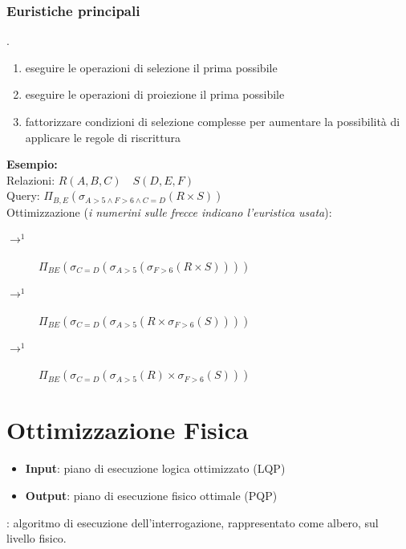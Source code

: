 \documentclass[12pt, a4paper]{report}
\begin{document}
    \subsubsection{Euristiche principali}
    .
    \begin{enumerate}
        \item eseguire le operazioni di selezione il prima possibile
        \item eseguire le operazioni di proiezione il prima possibile
        \item fattorizzare condizioni di selezione complesse per aumentare la possibilità di applicare le regole di riscrittura
    \end{enumerate}
    \textbf{Esempio:}\\
    Relazioni: $R(A,B,C) \quad S(D,E,F)$\\
    Query: $\Pi_{B,E}(\sigma_{A>5 \land F>6 \land C=D}(R\times S))$\\
    Ottimizzazione (\textit{i numerini sulle frecce indicano l'euristica usata}):
    \begin{description}
        \item[$\rightarrow^{1}$] $\Pi_{BE}(\sigma_{C=D}(\sigma_{A>5}(\sigma_{F>6}(R\times S))))$
        \item[$\rightarrow^{1}$] $\Pi_{BE}(\sigma_{C=D}(\sigma_{A>5}(R\times \sigma_{F>6}(S))))$
        \item[$\rightarrow^{1}$] $\Pi_{BE}(\sigma_{C=D}(\sigma_{A>5}(R)\times \sigma_{F>6}(S)))$
    \end{description}
    \section{Ottimizzazione Fisica}
    \begin{itemize}
        \item \textbf{Input}: piano di esecuzione logica ottimizzato (LQP)
        \item \textbf{Output}: piano di esecuzione fisico ottimale (PQP)
    \end{itemize}
    : algoritmo di esecuzione dell'interrogazione, rappresentato come albero, sul livello fisico.
\end{document}
